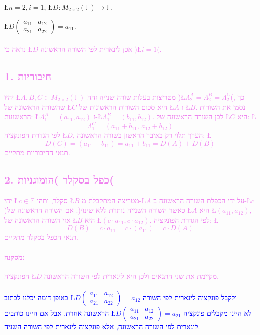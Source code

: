 \documentclass[english,hebrew]{article}
\begin{document}
\L{$n=2,i=1$}, \L{$D:M_{2\times2}(\mathbb{F})\rightarrow\mathbb{F}$}.

\L{$D\begin{pmatrix}a_{11} & a_{12}\\
a_{21} & a_{22}
\end{pmatrix}=a_{11}$}.\\
\\
\textcolor{violet}{נראה כי \L{$D$} אכן לינארית לפי השורה הראשונה
)\L{$i=1$}(.}

\subsection*{\textcolor{violet}{1. חיבוריות}}

\textcolor{violet}{יהיו \L{$A,B,C\in M_{2\times2}(\mathbb{F})$} מטריצות
בעלות שורה שנייה זהה )\L{$\Lambda_{2}^{A}=\Lambda_{2}^{B}=\Lambda_{2}^{C}$}(,
כך שהשורה הראשונה של \L{$C$} היא סכום השורות הראשונות של \L{$A$}
ו-\L{$B$}. נסמן את השורות הראשונות: \L{$\Lambda_{1}^{A}=(a_{11},a_{12})$}
ו-\L{$\Lambda_{1}^{B}=(b_{11},b_{12})$}. לכן השורה הראשונה של \L{$C$}
היא: \L{%
\[
\Lambda_{1}^{C}=(a_{11}+b_{11},\,a_{12}+b_{12})
\]
}%
לפי הגדרת הפונקציה \L{$D$}, הערך תלוי רק באיבר הראשון בשורה הראשונה:
\L{%
\[
D(C)=(a_{11}+b_{11})=a_{11}+b_{11}=D(A)+D(B)
\]
}%
תנאי החיבוריות מתקיים.}

\subsection*{\textcolor{violet}{2. כפל בסקלר )הומוגניות(}}

\textcolor{violet}{יהי \L{$c\in\mathbb{F}$} סקלר, ותהי \L{$B$} מטריצה
המתקבלת מ-\L{$A$} על ידי הכפלת השורה הראשונה ב-\L{$c$} )כאשר השורה
השנייה נותרת ללא שינוי(. אם השורה הראשונה של \L{$A$} היא \L{$(a_{11},a_{12})$},
אזי השורה הראשונה של \L{$B$} היא \L{$(c\cdot a_{11},c\cdot a_{12})$}.
לפי הגדרת הפונקציה: \L{%
\[
D(B)=c\cdot a_{11}=c\cdot(a_{11})=c\cdot D(A)
\]
}%
תנאי הכפל בסקלר מתקיים.}

\paragraph*{\textcolor{violet}{מסקנה:}}

\textcolor{violet}{הפונקציה \L{$D$} מקיימת את שני התנאים ולכן היא
לינארית לפי השורה הראשונה.}\textcolor{gray}{}\\
\textcolor{gray}{}\\
\textcolor{blue}{באופן דומה יכלנו לכתוב \L{$D\begin{pmatrix}a_{11} & a_{12}\\
a_{21} & a_{22}
\end{pmatrix}=a_{12}$} ולקבל פונקציה לינארית לפי השורה הראשונה אחרת. אבל אם היינו כותבים
\L{$D\begin{pmatrix}a_{11} & a_{12}\\
a_{21} & a_{22}
\end{pmatrix}=a_{21}$} לא היינו מקבלים פונקציה לינארית לפי השורה הראשונה, אלא פונקציה לינארית
לפי השורה השניה.}\\
\end{document}

